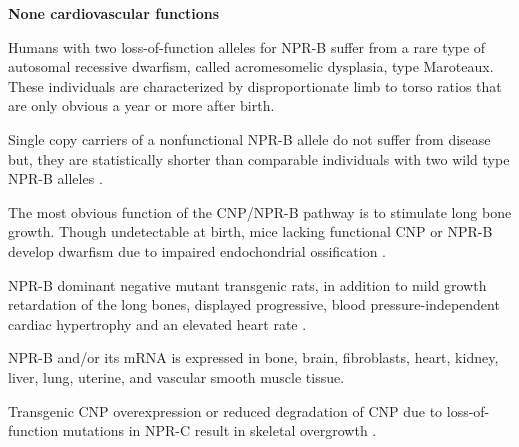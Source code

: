 \documentclass[14pt,a4paper,onecolumn]{extarticle}
\begin{document}
\textbf{None cardiovascular functions}

Humans with two loss-of-function alleles for NPR-B suffer from a rare type of autosomal recessive dwarfism, called acromesomelic dysplasia, type Maroteaux. These individuals are characterized by disproportionate limb to torso ratios that are only obvious a year or more after birth. \citep{Bartels2004}

Single copy carriers of a nonfunctional NPR-B allele do not suffer from disease but, they are statistically shorter than comparable individuals with two wild type NPR-B alleles \citep{Olney2006}. %

The most obvious function of the CNP/NPR-B pathway is to stimulate long bone growth. Though undetectable at birth, mice lacking functional CNP or NPR-B develop dwarfism due to impaired endochondrial ossification \citep{Tsuji2005}. %

NPR-B dominant negative mutant transgenic rats, in addition to mild growth retardation of the long bones, displayed progressive, blood pressure-independent cardiac hypertrophy and an elevated heart rate \citep{Langenickel2006}. %

NPR-B and/or its mRNA is expressed in bone, brain, fibroblasts, heart, kidney, liver, lung, uterine, and vascular smooth muscle tissue. \citep{Dickey2007}%

Transgenic CNP overexpression or reduced degradation of CNP due to loss-of-function mutations in NPR-C result in skeletal overgrowth \citep{Yasoda2004}. %


\end{document}
